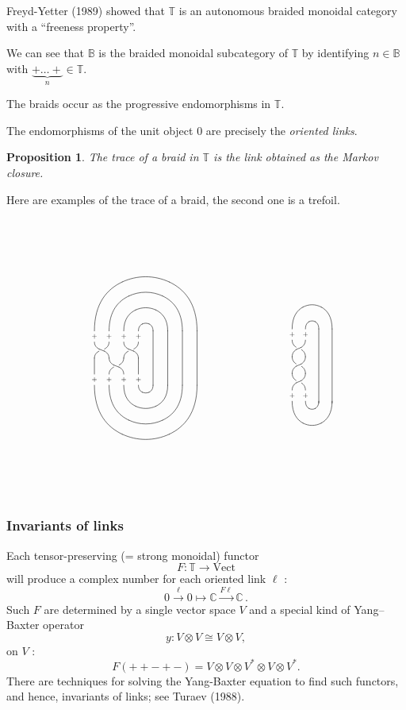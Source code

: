 \documentclass{beamer}
\newcommand{\lra}{\longrightarrow}
\newtheorem{proposition}[theorem]{Proposition}
\begin{document}
\begin{frame}
Freyd-Yetter (1989)  showed that $\mathbb{T}$ is an autonomous braided monoidal category with a ``freeness property''. 

\bigskip
We can see that $\mathbb{B}$ is the braided monoidal subcategory of $\mathbb{T}$ by identifying $n \in \mathbb{B}$ with  $\underbrace{+ \ldots +}_n \in \mathbb{T}$.   

\bigskip
The braids occur as the progressive endomorphisms in $\mathbb{T}$.   

\bigskip
The endomorphisms of the unit object 0 are precisely the \emph{oriented links}.

\end{frame}
\begin{frame}
\begin{proposition}
The trace of a braid in $\mathbb{T}$ is the link obtained as the Markov closure.
\end{proposition}
%
Here are examples of the trace of a braid, the second one is a trefoil.

\vskip-1.5cm\[
\xygraph{!{/r1.1pc/: /u1.2pc/::}
[uu] ( ?*+!D\txt\tiny{+}  !{+U\vcap[7]} [r(7)]="a7" , !{\vtwistneg}
( !{\xcapv-@(0)} []*+!U\txt\tiny{+} !{+D\vcap[-7]} [r(7)] - "a7"
 , [r] !{\vtwistneg} ( 
   ?*+!U\txt\tiny{+} !{+D\vcap[-5]} [r(5)] !{\POS= "a5"}
   , [r]*+!U\txt\tiny{+} !{+D\vcap[-3]}  [rrr]="a3"
 ) , [urrr] (
     ?*+!D\txt\tiny{+} !{+U\vcap} [r] !{\POS= "a1"}
    , [l]*+!D\txt\tiny{+} !{+U\vcap[3]} [rrr]- "a3"
    , [ll]*+!D\txt\tiny{+} !{+U\vcap[5]} [r(5)]- "a5"
 , [l]!{\vtwistneg}
   [r]!{\xcapv@(0)} []*+!U\txt\tiny{+} !{+D\vcap[-]} [r]- "a1"
)))}
\qquad\qquad\qquad\qquad
\xygraph{ !{0;/r1pc/:/u1.25pc/::} [uu]
 ( !{\vtwist\vtwist\vtwist}[uuu] 
   (?*+!D\txt\tiny{+} !{+U\vcap[3]}[rrr]-[d(4.45)] 
   , [r]*+!D\txt\tiny{+} !{+U\vcap}[r]-[d(4.45)]  )
 , [ddd]*+!U\txt\tiny{+} !{+D\vcap[-3]} 
 , [dddr]*+!U\txt\tiny{+} !{+D\vcap[-1]}
 )}
\]
\end{frame}
\begin{frame}
\frametitle{Invariants of links}

Each tensor-preserving (= strong monoidal) functor
\[
F : \mathbb{T}   \lra \mathrm{Vect}
\]
will produce a complex number for each oriented link $\ell$ :
\[
0 \stackrel{\ell}{\lra}  0   \longmapsto \mathbb{C}  \stackrel{F\ell}{\lra} \mathbb{C}\,.
\]
Such $F$ are determined by a single vector space $V$ and a special kind of Yang--Baxter operator
\[
y : V \otimes V \cong V \otimes V,
\]
on $V$ :
\[
F (+ + - + -) = V \otimes V \otimes V^\ast \otimes V \otimes V^\ast.
\]
There are techniques for solving the Yang-Baxter equation to find such functors, and hence, invariants of links; 
see Turaev (1988).
\end{frame}
\end{document}
